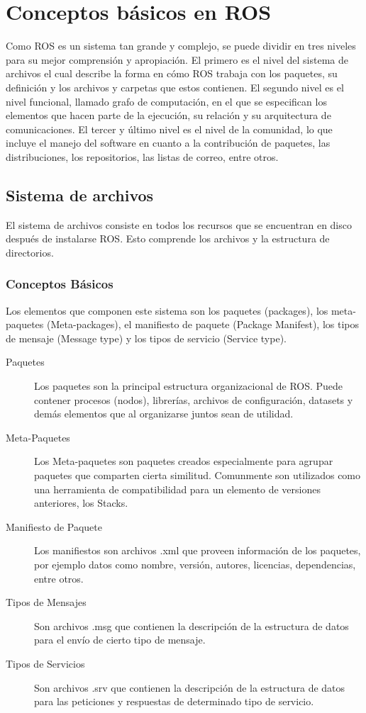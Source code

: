 \chapter{Conceptos básicos en ROS}

Como ROS es un sistema tan grande y complejo, se puede dividir en tres niveles para su mejor comprensión y apropiación. El primero es el nivel del sistema de archivos el cual describe la forma en cómo ROS trabaja con los paquetes, su definición y  los archivos y carpetas que estos contienen. El segundo nivel es el nivel funcional, llamado grafo de computación, en el que se especifican los elementos que hacen parte de la ejecución, su relación y su arquitectura de comunicaciones. El tercer y último nivel es el nivel de la comunidad, lo que incluye el manejo del software en cuanto a la contribución de paquetes, las distribuciones, los repositorios, las listas de correo, entre otros.

\section{Sistema de archivos}

El sistema de archivos consiste en todos los recursos que se encuentran en disco después de instalarse ROS. Esto comprende los archivos y la estructura de directorios. 

\subsection{Conceptos Básicos}

Los elementos que componen este sistema son los paquetes (packages), los meta-paquetes (Meta-packages), el manifiesto de paquete (Package Manifest), los tipos de mensaje (Message type) y los tipos de servicio (Service type).

\begin{description}
\item[Paquetes]
{
Los paquetes son la principal estructura organizacional de ROS. Puede contener procesos (nodos), librerías, archivos de configuración, datasets y demás elementos que al organizarse juntos sean de utilidad.
}
\item[Meta-Paquetes]
{
	Los Meta-paquetes son paquetes creados especialmente para agrupar paquetes que comparten cierta similitud. Comunmente son utilizados como una herramienta de compatibilidad para un elemento de versiones anteriores, los Stacks.
}
\item[Manifiesto de Paquete]
{
	Los manifiestos son archivos .xml que proveen información de los paquetes, por ejemplo datos como nombre, versión, autores, licencias, dependencias, entre otros.
}
\item[Tipos de Mensajes]
{
	Son archivos .msg que contienen la descripción de la estructura de datos para el envío de cierto tipo de mensaje.
}
\item[Tipos de Servicios]
{
	Son archivos .srv que contienen la descripción de la estructura de datos para las peticiones y respuestas de determinado tipo de servicio.
}
\end{description}

